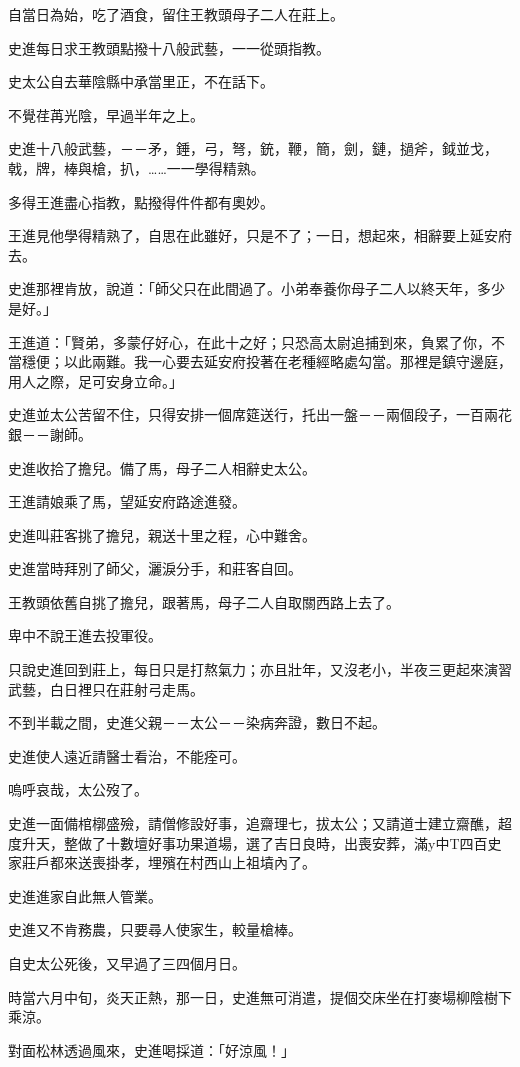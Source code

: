 \documentclass[11pt,a4paper]{article}
\begin{document}
自當日為始，吃了酒食，留住王教頭母子二人在莊上。

史進每日求王教頭點撥十八般武藝，一一從頭指教。

史太公自去華陰縣中承當里正，不在話下。

不覺荏苒光陰，早過半年之上。

史進十八般武藝，－－矛，錘，弓，弩，銃，鞭，簡，劍，鏈，撾斧，鉞並戈，戟，牌，棒與槍，扒，……一一學得精熟。

多得王進盡心指教，點撥得件件都有奧妙。

王進見他學得精熟了，自思在此雖好，只是不了；一日，想起來，相辭要上延安府去。

史進那裡肯放，說道：「師父只在此間過了。小弟奉養你母子二人以終天年，多少是好。」

王進道：「賢弟，多蒙仔好心，在此十之好；只恐高太尉追捕到來，負累了你，不當穩便；以此兩難。我一心要去延安府投著在老種經略處勾當。那裡是鎮守邊庭，用人之際，足可安身立命。」

史進並太公苦留不住，只得安排一個席筵送行，托出一盤－－兩個段子，一百兩花銀－－謝師。

史進收拾了擔兒。備了馬，母子二人相辭史太公。

王進請娘乘了馬，望延安府路途進發。

史進叫莊客挑了擔兒，親送十里之程，心中難舍。

史進當時拜別了師父，灑淚分手，和莊客自回。

王教頭依舊自挑了擔兒，跟著馬，母子二人自取關西路上去了。

卑中不說王進去投軍役。

只說史進回到莊上，每日只是打熬氣力；亦且壯年，又沒老小，半夜三更起來演習武藝，白日裡只在莊射弓走馬。

不到半載之間，史進父親－－太公－－染病奔證，數日不起。

史進使人遠近請醫士看治，不能痊可。

嗚呼哀哉，太公歿了。

史進一面備棺槨盛殮，請僧修設好事，追齋理七，拔太公；又請道士建立齋醮，超度升天，整做了十數壇好事功果道場，選了吉日良時，出喪安葬，滿y中T四百史家莊戶都來送喪掛孝，埋殯在村西山上祖墳內了。

史進進家自此無人管業。

史進又不肯務農，只要尋人使家生，較量槍棒。

自史太公死後，又早過了三四個月日。

時當六月中旬，炎天正熱，那一日，史進無可消遣，提個交床坐在打麥場柳陰樹下乘涼。

對面松林透過風來，史進喝採道：「好涼風！」
\end{document}
